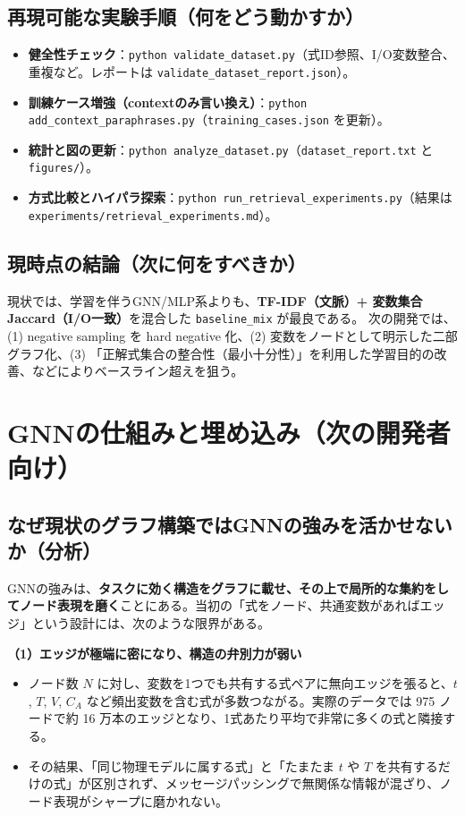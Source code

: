\documentclass[11pt,a4paper]{jsarticle}
\begin{document}
\subsection{再現可能な実験手順（何をどう動かすか）}
\begin{itemize}[nosep]
  \item \textbf{健全性チェック}：\texttt{python validate\_dataset.py}（式ID参照、I/O変数整合、重複など。レポートは \texttt{validate\_dataset\_report.json}）。
  \item \textbf{訓練ケース増強（contextのみ言い換え）}：\texttt{python add\_context\_paraphrases.py}（\texttt{training\_cases.json} を更新）。
  \item \textbf{統計と図の更新}：\texttt{python analyze\_dataset.py}（\texttt{dataset\_report.txt} と \texttt{figures/}）。
  \item \textbf{方式比較とハイパラ探索}：\texttt{python run\_retrieval\_experiments.py}（結果は \texttt{experiments/retrieval\_experiments.md}）。
\end{itemize}

\subsection{現時点の結論（次に何をすべきか）}
現状では、学習を伴うGNN/MLP系よりも、\textbf{TF-IDF（文脈）+ 変数集合Jaccard（I/O一致）}を混合した \texttt{baseline\_mix} が最良である。
次の開発では、(1) negative sampling を hard negative 化、(2) 変数をノードとして明示した二部グラフ化、(3) 「正解式集合の整合性（最小十分性）」を利用した学習目的の改善、などによりベースライン超えを狙う。

\section{GNNの仕組みと埋め込み（次の開発者向け）}

\subsection{なぜ現状のグラフ構築ではGNNの強みを活かせないか（分析）}
GNNの強みは、\textbf{タスクに効く構造をグラフに載せ、その上で局所的な集約をしてノード表現を磨く}ことにある。当初の「式をノード、共通変数があればエッジ」という設計には、次のような限界がある。

\textbf{（1）エッジが極端に密になり、構造の弁別力が弱い}
\begin{itemize}[nosep]
  \item ノード数 $N$ に対し、変数を1つでも共有する式ペアに無向エッジを張ると、$t$, $T$, $V$, $C_A$ など頻出変数を含む式が多数つながる。実際のデータでは 975 ノードで約 16 万本のエッジとなり、1式あたり平均で非常に多くの式と隣接する。
  \item その結果、「同じ物理モデルに属する式」と「たまたま $t$ や $T$ を共有するだけの式」が区別されず、メッセージパッシングで無関係な情報が混ざり、ノード表現がシャープに磨かれない。
\end{itemize}
\end{document}
